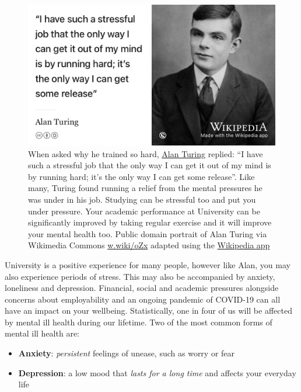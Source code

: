 \documentclass[
]{book}
\providecommand{\tightlist}{%
  \setlength{\itemsep}{0pt}\setlength{\parskip}{0pt}}
\begin{document}
\begin{figure}

{\centering \includegraphics[width=0.99\linewidth]{images/turunning-machine} 

}

\caption{When asked why he trained so hard, \href{https://en.wikipedia.org/wiki/Alan_Turing}{Alan Turing} replied: ``I have such a stressful job that the only way I can get it out of my mind is by running hard; it's the only way I can get some release''. Like many, Turing found running a relief from the mental pressures he was under in his job. \citep{kottke} Studying can be stressful too and put you under pressure. Your academic performance at University can be significantly improved by taking regular exercise and it will improve your mental health too. Public domain portrait of Alan Turing via Wikimedia Commons \href{https://w.wiki/oZx}{w.wiki/oZx} adapted using the \href{https://apps.apple.com/gb/app/wikipedia/id324715238}{Wikipedia app}}\label{fig:turing-stress-fig}
\end{figure}



University is a positive experience for many people, however like Alan, you may also experience periods of stress. This may also be accompanied by anxiety, loneliness and depression. Financial, social and academic pressures alongside concerns about employability and an ongoing pandemic of COVID-19 can all have an impact on your wellbeing. Statistically, one in four of us will be affected by mental ill health during our lifetime. Two of the most common forms of mental ill health are:

\begin{itemize}
\tightlist
\item
  \textbf{Anxiety}: \emph{persistent} feelings of unease, such as worry or fear
\item
  \textbf{Depression}: a low mood that \emph{lasts for a long time} and affects your everyday life
\end{itemize}
\end{document}
